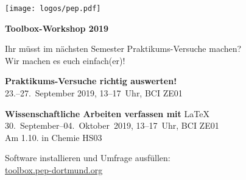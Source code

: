 \documentclass[paper=landscape]{scrartcl}
\begin{document}
  
  \begin{minipage}{0.25\textwidth}%
    \texttt{[image: logos/pep.pdf]}%
  \end{minipage}%
  \begin{minipage}{0.75\textwidth}%
    \centering\fontsize{50}{60}\bfseries\selectfont Toolbox-Workshop 2019%
  \end{minipage}%

  \vspace{0.5cm}

  \begin{center}
    \Huge Ihr müsst im nächsten Semester Praktikums-Versuche machen? \\[0.5\baselineskip]
    Wir machen es euch einfach(er)!
  \end{center}
  
  \vspace{0.5cm}

  \begin{center}
    \huge \textbf{Praktikums-Versuche richtig auswerten!} \\[0.5\baselineskip]
    23.–27.~September 2019, 13–17~Uhr, BCI ZE01
  \end{center}
  \vspace{0.5cm}
  \begin{center}
    \huge \textbf{Wissenschaftliche Arbeiten verfassen mit} \textrm{\LaTeX}\\[0.5\baselineskip]
    30.~September–04.~Oktober~2019, 13–17~Uhr, BCI ZE01\\
    \textcolor{red!80!black}{Am 1.10. in Chemie HS03}
  \end{center}
  \vspace{0.5cm}
  \begin{center}
    \large Software installieren und Umfrage ausfüllen: \\
    \Huge \href{https://toolbox.pep-dortmund.org}{toolbox.pep-dortmund.org}
  \end{center}

\end{document}
